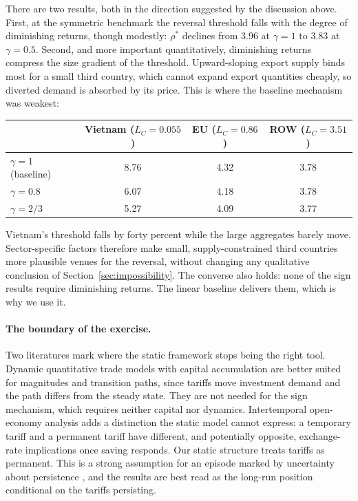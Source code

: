 \documentclass[11pt]{article}
\theoremstyle{plain}
\theoremstyle{remark}
\numberwithin{lemma}{section}
\numberwithin{proposition}{section}
\numberwithin{corollary}{section}
\newenvironment{revblock}{\par\begingroup\color{RevBlue}}{\endgroup\par}
\begin{document}
\begin{revblock}
There are two results, both in the direction suggested by the discussion above. First, at the symmetric benchmark the reversal threshold falls with the degree of diminishing returns, though modestly: $\rho^*$ declines from $3.96$ at $\gamma = 1$ to $3.83$ at $\gamma = 0.5$. Second, and more important quantitatively, diminishing returns compress the size gradient of the threshold. Upward-sloping export supply binds most for a small third country, which cannot expand export quantities cheaply, so diverted demand is absorbed by its price. This is where the baseline mechanism was weakest:
\begin{center}
\begin{tabular}{lccc}
\hline
 & Vietnam ($L_C = 0.055$) & EU ($L_C = 0.86$) & ROW ($L_C = 3.51$) \\
\hline
$\gamma = 1$ (baseline) & 8.76 & 4.32 & 3.78 \\
$\gamma = 0.8$          & 6.07 & 4.18 & 3.78 \\
$\gamma = 2/3$          & 5.27 & 4.09 & 3.77 \\
\hline
\end{tabular}
\end{center}
Vietnam's threshold falls by forty percent while the large aggregates barely move. Sector-specific factors therefore make small, supply-constrained third countries more plausible venues for the reversal, without changing any qualitative conclusion of Section~\ref{sec:impossibility}. The converse also holds: none of the sign results require diminishing returns. The linear baseline delivers them, which is why we use it.

\paragraph{The boundary of the exercise.} Two literatures mark where the static framework stops being the right tool. Dynamic quantitative trade models with capital accumulation \citep{eaton2016, caliendo2019} are better suited for magnitudes and transition paths, since tariffs move investment demand and the path differs from the steady state. They are not needed for the sign mechanism, which requires neither capital nor dynamics. Intertemporal open-economy analysis \citep{obstfeld1996foundations} adds a distinction the static model cannot express: a temporary tariff and a permanent tariff have different, and potentially opposite, exchange-rate implications once saving responds. Our static structure treats tariffs as permanent. This is a strong assumption for an episode marked by uncertainty about persistence \citep{kalemli2025}, and the results are best read as the long-run position conditional on the tariffs persisting.
\end{revblock}
\end{document}

